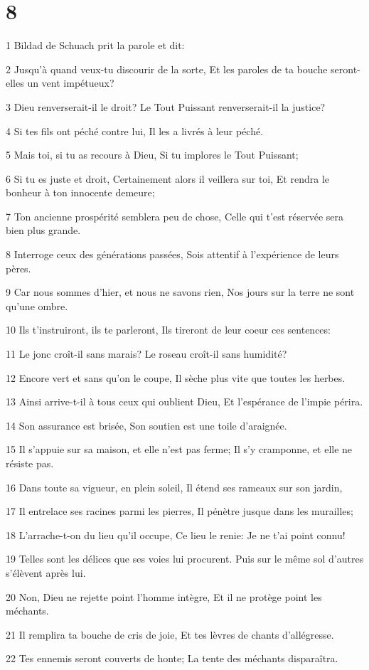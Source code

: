 \chapter{8}

\par 1 Bildad de Schuach prit la parole et dit:
\par 2 Jusqu'à quand veux-tu discourir de la sorte, Et les paroles de ta bouche seront-elles un vent impétueux?
\par 3 Dieu renverserait-il le droit? Le Tout Puissant renverserait-il la justice?
\par 4 Si tes fils ont péché contre lui, Il les a livrés à leur péché.
\par 5 Mais toi, si tu as recours à Dieu, Si tu implores le Tout Puissant;
\par 6 Si tu es juste et droit, Certainement alors il veillera sur toi, Et rendra le bonheur à ton innocente demeure;
\par 7 Ton ancienne prospérité semblera peu de chose, Celle qui t'est réservée sera bien plus grande.
\par 8 Interroge ceux des générations passées, Sois attentif à l'expérience de leurs pères.
\par 9 Car nous sommes d'hier, et nous ne savons rien, Nos jours sur la terre ne sont qu'une ombre.
\par 10 Ils t'instruiront, ils te parleront, Ils tireront de leur coeur ces sentences:
\par 11 Le jonc croît-il sans marais? Le roseau croît-il sans humidité?
\par 12 Encore vert et sans qu'on le coupe, Il sèche plus vite que toutes les herbes.
\par 13 Ainsi arrive-t-il à tous ceux qui oublient Dieu, Et l'espérance de l'impie périra.
\par 14 Son assurance est brisée, Son soutien est une toile d'araignée.
\par 15 Il s'appuie sur sa maison, et elle n'est pas ferme; Il s'y cramponne, et elle ne résiste pas.
\par 16 Dans toute sa vigueur, en plein soleil, Il étend ses rameaux sur son jardin,
\par 17 Il entrelace ses racines parmi les pierres, Il pénètre jusque dans les murailles;
\par 18 L'arrache-t-on du lieu qu'il occupe, Ce lieu le renie: Je ne t'ai point connu!
\par 19 Telles sont les délices que ses voies lui procurent. Puis sur le même sol d'autres s'élèvent après lui.
\par 20 Non, Dieu ne rejette point l'homme intègre, Et il ne protège point les méchants.
\par 21 Il remplira ta bouche de cris de joie, Et tes lèvres de chants d'allégresse.
\par 22 Tes ennemis seront couverts de honte; La tente des méchants disparaîtra.


